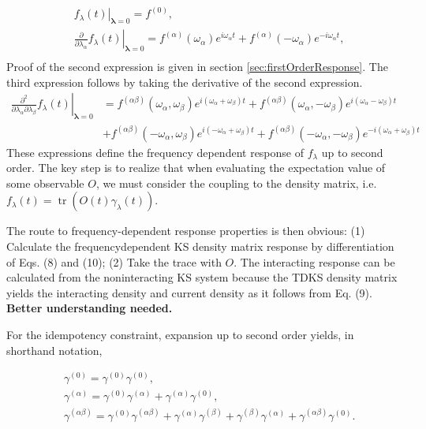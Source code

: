 \documentclass[12pt]{article}
\begin{document}
\begin{align}
& \left.f_{\lambda}(t)\right|_{\boldsymbol{\lambda}=0}=f^{(0)},  \\
& \left.\frac{\partial}{\partial \lambda_{\alpha}} f_{\lambda}(t)\right|_{\boldsymbol{\lambda}=0}=f^{(\alpha)}\left(\omega_{\alpha}\right) e^{i \omega_{\alpha} t}+f^{(\alpha)}\left(-\omega_{\alpha}\right) e^{-i \omega_{\alpha} t},  \\
\end{align}
Proof of the second expression is given in section \ref{sec:firstOrderResponse}. The third expression follows by taking the derivative of the second expression.
\begin{align}
    \left.\frac{\partial^{2}}{\partial \lambda_{\alpha} \partial \lambda_{\beta}} f_{\lambda}(t)\right|_{\boldsymbol{\lambda}=0}&= f^{(\alpha \beta)}  \left(\omega_{\alpha}, \omega_{\beta}\right) e^{i\left(\omega_{\alpha}+\omega_{\beta}\right) t} + f^{(\alpha \beta)}  \left(\omega_{\alpha}, -\omega_{\beta}\right) e^{i\left(\omega_{\alpha}-\omega_{\beta}\right) t}\\
 &+ f^{(\alpha \beta)}  \left(-\omega_{\alpha}, \omega_{\beta}\right) e^{i\left(-\omega_{\alpha}+\omega_{\beta}\right) t} + f^{(\alpha \beta)}  \left(-\omega_{\alpha}, -\omega_{\beta}\right) e^{-i\left(\omega_{\alpha}+\omega_{\beta}\right) t}
\end{align}
These expressions define the frequency dependent response of $f_{\lambda}$ up to second order. The key step is to realize that when evaluating the expectation value of some observable $O$, we must consider the coupling to the density matrix, i.e. $f_{\lambda}(t)=\operatorname{tr}\left(O(t) \gamma_{\lambda}(t)\right)$.
 
The route to frequency-dependent response properties is then obvious: (1) Calculate the frequencydependent KS density matrix response by differentiation of Eqs. (8) and (10); (2) Take the trace with $O$. The interacting response can be calculated from the noninteracting KS system because the TDKS density matrix yields the interacting density and current density as it follows from Eq. (9). \textbf{Better understanding needed.}

For the idempotency constraint, expansion up to second order yields, in shorthand notation,


\begin{align*}
& \gamma^{(0)}=\gamma^{(0)} \gamma^{(0)},  \tag{16}\\
& \gamma^{(\alpha)}=\gamma^{(0)} \gamma^{(\alpha)}+\gamma^{(\alpha)} \gamma^{(0)},  \tag{17}\\
& \gamma^{(\alpha \beta)}=\gamma^{(0)} \gamma^{(\alpha \beta)}+\gamma^{(\alpha)} \gamma^{(\beta)}+\gamma^{(\beta)} \gamma^{(\alpha)}+\gamma^{(\alpha \beta)} \gamma^{(0)} . \tag{18}
\end{align*}
\end{document}
